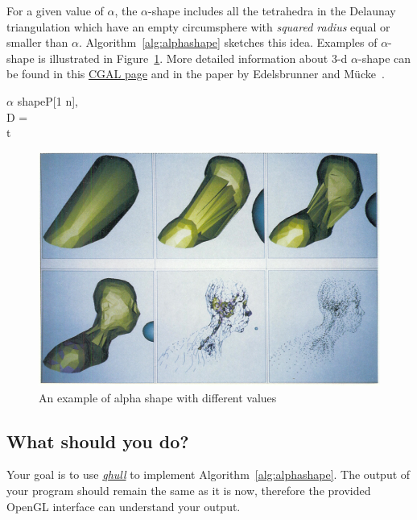 \documentclass[11pt]{article}
\begin{document}
For a given value of $\alpha$, 
the $\alpha$-shape includes all the tetrahedra in the Delaunay triangulation which have an empty circumsphere with {\em squared radius} equal or smaller than $\alpha$.
Algorithm~\ref{alg:alphashape} sketches this idea. Examples of $\alpha$-shape is illustrated in Figure~\ref{alg:alpha}.
More detailed information about 3-d  $\alpha$-shape can be found in this 
\href{http://www.cgal.org/Manual/latest/doc_html/cgal_manual/Alpha_shapes_3/Chapter_main.html}{CGAL page} and in
the paper by Edelsbrunner and M\"{u}cke~\cite{em-tdas-94}.

{\small
	\begin{pseudocode}[shadowbox]{$\alpha$ shape}{P[1 \cdots n], \alpha}
	\label{alg:alphashape}
	\\
	D =  \\
	 \DO
	\BEGIN
	\IF {}  \DO
		 t
	\END
	\end{pseudocode}
}


\begin{figure}[h]
\centering
\includegraphics[width=.5\textwidth]{FIGS/alphashape}
\caption{An example of alpha shape with different values}
\label{alg:alpha}
\end{figure}




\subsection{What should  you do?}

Your goal is to use \href{http://www.qhull.org/}{\it qhull} to implement Algorithm~\ref{alg:alphashape}.
The output of your program should remain the same as it is now, therefore
the provided OpenGL interface can understand your output.
\end{document}

